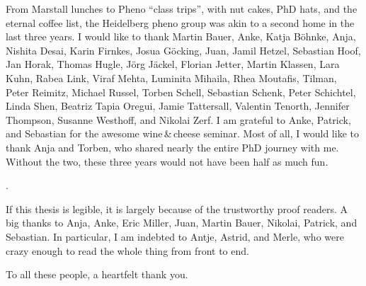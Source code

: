 From Marstall lunches to Pheno ``class trips'', with nut cakes, PhD
hats, and the eternal coffee list, the Heidelberg pheno group was akin
to a second home in the last three years. I would like to thank Martin
Bauer, Anke, Katja B\"ohnke, Anja, Nishita Desai, Karin Firnkes, Josua
G\"ocking, Juan, Jamil Hetzel, Sebastian Hoof, Jan Horak, Thomas
Hugle, J\"org J\"ackel, Florian Jetter, Martin Klassen, Lara Kuhn,
Rabea Link, Viraf Mehta, Luminita Mihaila, Rhea Moutafis, Tilman,
Peter Reimitz, Michael Russel, Torben Schell, Sebastian Schenk, Peter
Schichtel, Linda Shen, Beatriz Tapia Oregui, Jamie Tattersall,
Valentin Tenorth, Jennifer Thompson, Susanne Westhoff, and Nikolai
Zerf. I am grateful to Anke, Patrick, and Sebastian for the awesome
wine\,\&\,cheese seminar. Most of all, I would like to thank Anja and
Torben, who shared nearly the entire PhD journey with me. Without the
two, these three years would not have been half as much fun.

.


If this thesis is legible, it is largely because of the trustworthy
proof readers. A big thanks to Anja, Anke, Eric Miller, Juan, Martin
Bauer, Nikolai, Patrick, and Sebastian. In particular, I am
indebted to Antje, Astrid, and Merle, who were crazy enough to read
the whole thing from front to end.

To all these people, a heartfelt thank you.
